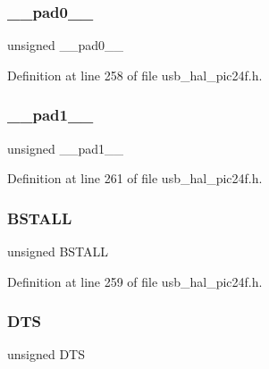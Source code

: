 \mbox{\label{union___b_d___s_t_a_t_adf71f3d8410c1f1dbbc96680a92c49af}} 
\subsubsection{\texorpdfstring{\_\_pad0\_\_}{\_\_pad0\_\_}}
{\footnotesize\ttfamily unsigned \+\_\+\+\_\+pad0\+\_\+\+\_\+}



Definition at line 258 of file usb\+\_\+hal\+\_\+pic24f.\+h.

\mbox{\label{union___b_d___s_t_a_t_acaf2d0924a107ec6e8d2e31febaf66f9}} 
\subsubsection{\texorpdfstring{\_\_pad1\_\_}{\_\_pad1\_\_}}
{\footnotesize\ttfamily unsigned \+\_\+\+\_\+pad1\+\_\+\+\_\+}



Definition at line 261 of file usb\+\_\+hal\+\_\+pic24f.\+h.

\mbox{\label{union___b_d___s_t_a_t_a145ee75f12c62d2a89097d18477019f2}} 
\subsubsection{\texorpdfstring{BSTALL}{BSTALL}}
{\footnotesize\ttfamily unsigned B\+S\+T\+A\+LL}



Definition at line 259 of file usb\+\_\+hal\+\_\+pic24f.\+h.

\mbox{\label{union___b_d___s_t_a_t_a74db087bfe32cd33c459191f7a4aeb13}} 
\subsubsection{\texorpdfstring{DTS}{DTS}}
{\footnotesize\ttfamily unsigned D\+TS}




